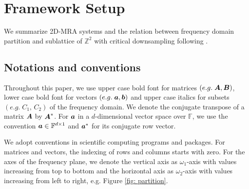 \section{Framework Setup}\label{sec: setup}
We summarize 2D-MRA systems and the relation between frequency domain partition and sublattice of $\mathbb{Z}^2$ with critical downsampling following \cite{yin2014orthshear}.

\subsection{Notations and conventions}
Throughout this paper, we use upper case bold font for matrices $(e.g.\;\boldsymbol{A},\boldsymbol{B})$, lower case bold font for vectors $(e.g.\;\boldsymbol{a},\boldsymbol{b})$ and upper case italics for subsets $(e.g.\;C_1,\,C_2)$ of the frequency domain. We denote the conjugate transpose of a matrix $\boldsymbol{A}$ by $\boldsymbol{A}^*$. For $\boldsymbol{a}$ in a $d$-dimensional vector space over $\mathbb{F}$, we use the convention $\boldsymbol{a}\in\mathbb{F}^{d\times 1}$ and $\boldsymbol{a}^*$ for its conjugate row vector. 

We adopt conventions in scientific computing programs and packages. For matrices and vectors, the indexing of rows and columns starts with zero. For the axes of the frequency plane, we denote the vertical axis as $\omega_1$-axis with values increasing from top to bottom and the horizontal axis as $\omega_2$-axis with values increasing from left to right, e.g. Figure \ref{fig: partition}.

